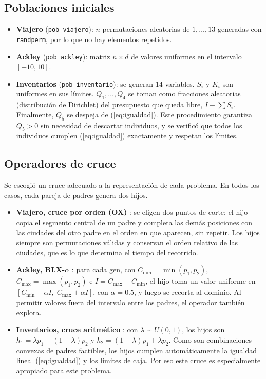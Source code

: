 \documentclass[conference]{IEEEtran}
\begin{document}
\subsection{Poblaciones iniciales}
\begin{itemize}
\item \textbf{Viajero} (\texttt{pob\_viajero}): $n$ permutaciones aleatorias de $1,\dots,13$ generadas con \texttt{randperm}, por lo que no hay elementos repetidos.
\item \textbf{Ackley} (\texttt{pob\_ackley}): matriz $n\times d$ de valores uniformes en el intervalo $[-10,10]$.
\item \textbf{Inventarios} (\texttt{pob\_inventario}): se generan 14 variables. $S_i$ y $K_i$ son uniformes en sus l\'imites. $Q_1,\dots,Q_4$ se toman como fracciones aleatorias (distribuci\'on de Dirichlet) del presupuesto que queda libre, $I-\sum S_i$. Finalmente, $Q_5$ se despeja de (\ref{eq:igualdad}). Este procedimiento garantiza $Q_5>0$ sin necesidad de descartar individuos, y se verific\'o que todos los individuos cumplen (\ref{eq:igualdad}) exactamente y respetan los l\'imites.
\end{itemize}

\subsection{Operadores de cruce}
Se escogi\'o un cruce adecuado a la representaci\'on de cada problema. En todos los casos, cada pareja de padres genera dos hijos.
\begin{itemize}
\item \textbf{Viajero, cruce por orden (OX)} \cite{larranaga}: se eligen dos puntos de corte; el hijo copia el segmento central de un padre y completa las dem\'as posiciones con las ciudades del otro padre en el orden en que aparecen, sin repetir. Los hijos siempre son permutaciones v\'alidas y conservan el orden relativo de las ciudades, que es lo que determina el tiempo del recorrido.
\item \textbf{Ackley, BLX-$\alpha$} \cite{herrera}: para cada gen, con $C_{\min}=\min(p_1,p_2)$, $C_{\max}=\max(p_1,p_2)$ e $I=C_{\max}-C_{\min}$, el hijo toma un valor uniforme en $[C_{\min}-\alpha I,\;C_{\max}+\alpha I]$, con $\alpha=0.5$, y luego se recorta al dominio. Al permitir valores fuera del intervalo entre los padres, el operador tambi\'en explora.
\item \textbf{Inventarios, cruce aritm\'etico} \cite{herrera}: con $\lambda\sim U(0,1)$, los hijos son $h_1=\lambda p_1+(1-\lambda)p_2$ y $h_2=(1-\lambda)p_1+\lambda p_2$. Como son combinaciones convexas de padres factibles, los hijos cumplen autom\'aticamente la igualdad lineal (\ref{eq:igualdad}) y los l\'imites de caja. Por eso este cruce es especialmente apropiado para este problema.
\end{itemize}
\end{document}
